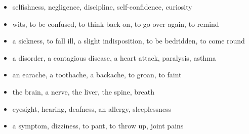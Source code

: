\begin{itemize}
\raggedright
  \item selfishness, negligence, discipline, self-confidence, curiosity
  \item wits, to be confused, to think back on, to go over again, to remind
  \item a sickness, to fall ill, a slight indisposition, to be bedridden, to come round
  \item a disorder, a contagious disease, a heart attack, paralysis, asthma
  \item an earache, a toothache, a backache, to groan, to faint
  \item the brain, a nerve, the liver, the spine, breath
  \item eyesight, hearing, deafness, an allergy, sleeplessness
  \item a symptom, dizziness, to pant, to throw up, joint pains
\end{itemize}

